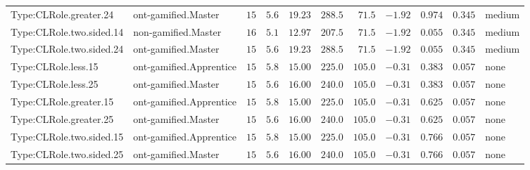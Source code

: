 \documentclass[6pt,a4paper]{article}
\begin{document}
{\begin{longtable}{llrrrrrrrrl}
Type:CLRole.greater.24&ont-gamified.Master&$15$&$5.6$&$19.23$&$ 288.5$&$ 71.5$&$-1.92$&$0.974$&$0.345$&medium\tabularnewline
Type:CLRole.two.sided.14&non-gamified.Master&$16$&$5.1$&$12.97$&$ 207.5$&$ 71.5$&$-1.92$&$0.055$&$0.345$&medium\tabularnewline
Type:CLRole.two.sided.24&ont-gamified.Master&$15$&$5.6$&$19.23$&$ 288.5$&$ 71.5$&$-1.92$&$0.055$&$0.345$&medium\tabularnewline
Type:CLRole.less.15&ont-gamified.Apprentice&$15$&$5.8$&$15.00$&$ 225.0$&$105.0$&$-0.31$&$0.383$&$0.057$&none\tabularnewline
Type:CLRole.less.25&ont-gamified.Master&$15$&$5.6$&$16.00$&$ 240.0$&$105.0$&$-0.31$&$0.383$&$0.057$&none\tabularnewline
Type:CLRole.greater.15&ont-gamified.Apprentice&$15$&$5.8$&$15.00$&$ 225.0$&$105.0$&$-0.31$&$0.625$&$0.057$&none\tabularnewline
Type:CLRole.greater.25&ont-gamified.Master&$15$&$5.6$&$16.00$&$ 240.0$&$105.0$&$-0.31$&$0.625$&$0.057$&none\tabularnewline
\newpage
Type:CLRole.two.sided.15&ont-gamified.Apprentice&$15$&$5.8$&$15.00$&$ 225.0$&$105.0$&$-0.31$&$0.766$&$0.057$&none\tabularnewline
Type:CLRole.two.sided.25&ont-gamified.Master&$15$&$5.6$&$16.00$&$ 240.0$&$105.0$&$-0.31$&$0.766$&$0.057$&none\tabularnewline
\hline
\end{longtable}}
\end{document}
